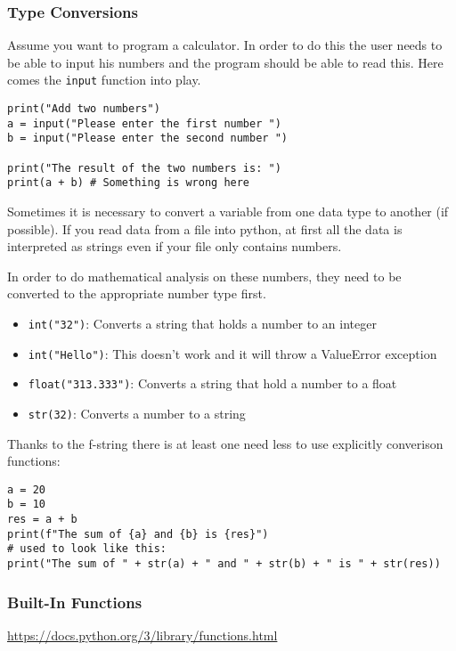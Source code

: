 \documentclass[10pt, a4paper]{beamer} %
\begin{document}
\begin{frame}
	\frametitle{Type Conversions}

	Assume you want to program a calculator.
	In order to do this the user needs to be able to input his numbers and the program should be able to read this.
	Here comes the \lstinline!input! function into play.

	\begin{lstlisting}
print("Add two numbers")
a = input("Please enter the first number ")
b = input("Please enter the second number ")

print("The result of the two numbers is: ")
print(a + b) # Something is wrong here
\end{lstlisting}


	\framebreak
	Sometimes it is necessary to convert a variable from one data type to another (if possible). If you
	read data from a file into python, at first all the data is interpreted as strings even if your file only
	contains numbers.

	In order to do mathematical analysis on these numbers, they need to be converted to the appropriate number type first.

	\begin{itemize}
		\item \lstinline!int("32")!: Converts a string that holds a number to an integer
		\item \lstinline!int("Hello")!: This doesn't work and it will throw a ValueError exception
		\item \lstinline!float("313.333")!: Converts a string that hold a number to a float
		\item \lstinline!str(32)!: Converts a number to a string
	\end{itemize}

	Thanks to the f-string there is at least one need less to use explicitly converison functions:
	\begin{examples}
		\begin{lstlisting}
a = 20
b = 10
res = a + b
print(f"The sum of {a} and {b} is {res}")
# used to look like this:
print("The sum of " + str(a) + " and " + str(b) + " is " + str(res))
\end{lstlisting}
	\end{examples}
\end{frame}

\begin{frame}[c]\frametitle{Built-In Functions}
	\url{https://docs.python.org/3/library/functions.html}
\end{frame}
\end{document}
